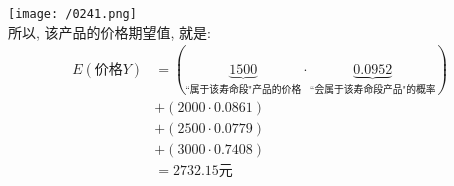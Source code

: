 \documentclass[UTF8]{ctexart}
\begin{document}
\begin{myEnvSample}
\texttt{[image: /0241.png]} \\

所以, 该产品的价格期望值, 就是: \\
\begin{align*}  %
	E(\text{价格}Y) & =\left( \underset{\text{``属于该寿命段"产品的价格}}{\underbrace{1500}}\cdot \underset{\text{``会属于该寿命段产品"的概率}}{\underbrace{0.0952}} \right)\\
& +\left( 2000\cdot 0.0861 \right)\\
& +\left( 2500\cdot 0.0779 \right)\\
& +\left( 3000\cdot 0.7408 \right)\\
& =2732.15 \text{元}
\end{align*}
\end{myEnvSample}
	
	
	
\end{document}
